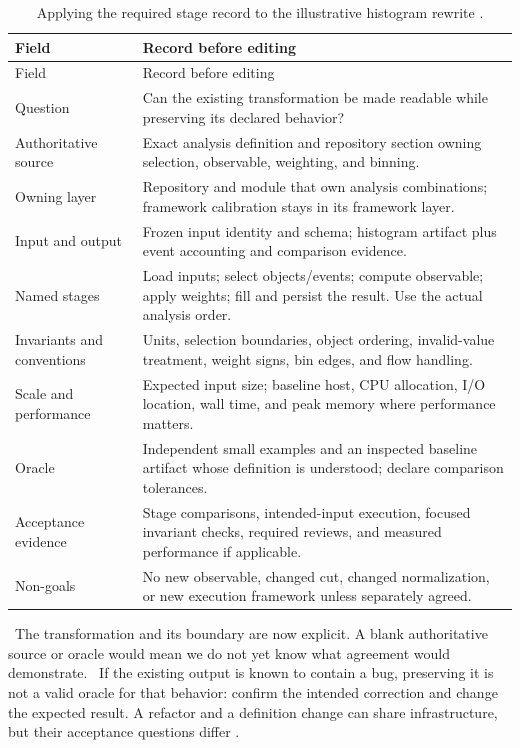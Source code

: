 \begingroup
\small
\begin{longtable}{L{0.27\textwidth}L{0.66\textwidth}}
  \caption{Applying the required stage record to the illustrative histogram rewrite
    \cite[Establish the scientific contract]{skill:coding}.}\label{tab:stage}\\
  \toprule
  Field & Record before editing \\
  \midrule
  \endfirsthead
  \toprule Field & Record before editing \\ \midrule
  \endhead
  Question & Can the existing transformation be made readable while preserving
  its declared behavior? \\
  Authoritative source & Exact analysis definition and repository section owning
  selection, observable, weighting, and binning. \\
  Owning layer & Repository and module that own analysis combinations; framework
  calibration stays in its framework layer. \\
  Input and output & Frozen input identity and schema; histogram artifact plus
  event accounting and comparison evidence. \\
  Named stages & Load inputs; select objects/events; compute observable; apply
  weights; fill and persist the result. Use the actual analysis order. \\
  Invariants and conventions & Units, selection boundaries, object ordering,
  invalid-value treatment, weight signs, bin edges, and flow handling. \\
  Scale and performance & Expected input size; baseline host, CPU allocation,
  I/O location, wall time, and peak memory where performance matters. \\
  Oracle & Independent small examples and an inspected baseline artifact whose
  definition is understood; declare comparison tolerances. \\
  Acceptance evidence & Stage comparisons, intended-input execution, focused
  invariant checks, required reviews, and measured performance if applicable. \\
  Non-goals & No new observable, changed cut, changed normalization, or new
  execution framework unless separately agreed. \\
  \bottomrule
\end{longtable}
\endgroup

\contract\ The transformation and its boundary are now explicit. A blank authoritative source or
oracle would mean we do not yet know what agreement would demonstrate.
\gap\ If the existing output is known to contain a bug, preserving it is not a valid
oracle for that behavior: confirm the intended correction and change the expected result.
A refactor and a definition change can share infrastructure, but their acceptance
questions differ \cite[Numerical evidence]{skill:implementation}.

